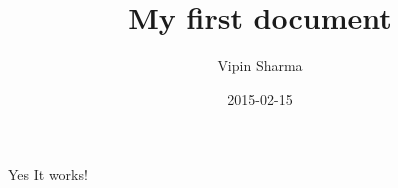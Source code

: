\documentclass{article}
\title{My first document}
\date{2015-02-15}
\author{Vipin Sharma}
\begin{document}
  \maketitle
  \newpage
  	Yes It works!
\end{document}
